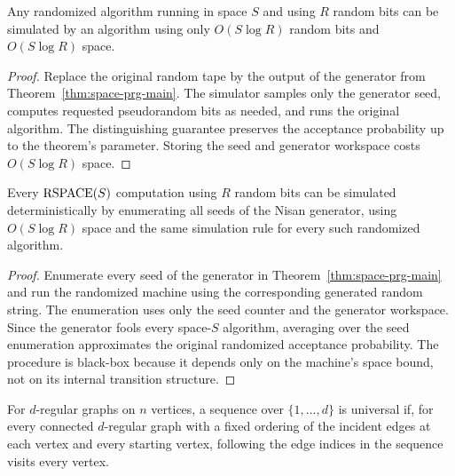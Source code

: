 \begin{corollary}
  \label{cor:randomness-reduction}
  Any randomized algorithm running in space $S$ and using $R$ random bits can
  be simulated by an algorithm using only $O(S\log R)$ random bits and
  $O(S\log R)$ space.
\end{corollary}
\begin{proof}
  Replace the original random tape by the output of the generator from
  Theorem~\ref{thm:space-prg-main}. The simulator samples only the generator
  seed, computes requested pseudorandom bits as needed, and runs the original
  algorithm. The distinguishing guarantee preserves the acceptance probability
  up to the theorem's parameter. Storing the seed and generator workspace costs
  $O(S\log R)$ space.
\end{proof}

\begin{corollary}
  \label{cor:black-box-savitch}
  Every $\operatorname{RSPACE}(S)$ computation using $R$ random bits can be simulated
  deterministically by enumerating all seeds of the Nisan generator, using
  $O(S\log R)$ space and the same simulation rule for every such randomized
  algorithm.
\end{corollary}
\begin{proof}
  Enumerate every seed of the generator in Theorem~\ref{thm:space-prg-main}
  and run the randomized machine using the corresponding generated random
  string. The enumeration uses only the seed counter and the generator
  workspace. Since the generator fools every space-$S$ algorithm, averaging
  over the seed enumeration approximates the original randomized acceptance
  probability. The procedure is black-box because it depends only on the
  machine's space bound, not on its internal transition structure.
\end{proof}

\begin{definition}
  \label{def:universal-traversal-sequence}
  For $d$-regular graphs on $n$ vertices, a sequence over $\{1,\ldots,d\}$ is
  universal if, for every connected $d$-regular graph with a fixed ordering of
  the incident edges at each vertex and every starting vertex, following the
  edge indices in the sequence visits every vertex.
\end{definition}

